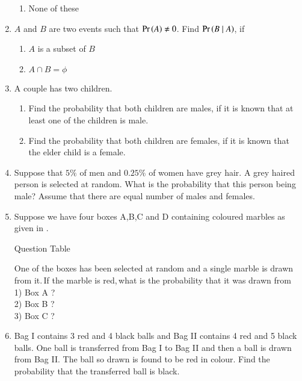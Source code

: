 \begin{enumerate}[label=\thesubsection.\arabic*,ref=\thesubsection.\theenumi]
\begin{enumerate}
\item None of these
\end{enumerate}
\solution
%
\item $A$ and $B$ are two events such that $\Pr\left(A\right) \neq 0$. Find $\Pr\left(B \mid A\right)$, if
\begin{enumerate}
\item $A$ is a subset of $B$
\item $A \cap B = \phi$
\end{enumerate}
\solution 
\item A couple has two children.
\begin{enumerate}
\item Find the probability that both children are males, if it is known that at least one of the children is male.
\item Find the probability that both children are females, if it is known that the elder child is a female.
\end{enumerate}
\solution 
	\item Suppose that $5\%$ of men and $0.25\%$ of women have grey hair. A grey haired person is selected at random. What is the probability that this person being male? Assume that there are equal number of males and females.
\\
\solution
\item Suppose we have four boxes A,B,C and D containing coloured marbles as given in . 
\begin{table}[htbp]
\centering
%
\caption{Question Table}
\label{tab:12/13/6/12/table1}
\end{table}
One of the boxes has been selected at random and a single marble is drawn from it.$\,$If the marble is red,$\,$what is the probability that it was drawn from \\1) Box A ?\\2) Box B ?\\3) Box C ?
\\
\solution 
\item Bag I contains 3 red and 4 black balls and Bag II contains 4 red and 5 black balls.
One ball is transferred from Bag I to Bag II and then a ball is drawn from Bag II.
The ball so drawn is found to be red in colour. Find the probability that the
transferred ball is black. 
\\

\end{enumerate}
